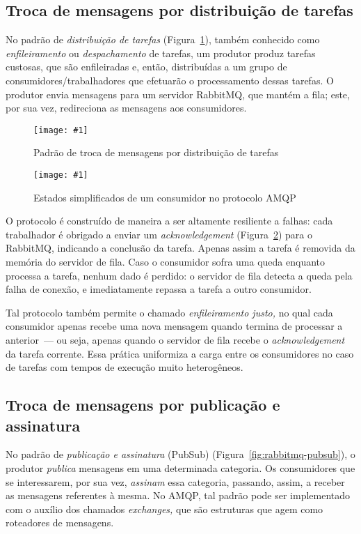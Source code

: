 \documentclass[ruledheader, 12pt]{abnt}
\newcommand{\figcustom}[4]{\par
	\begin{figure}[#3]
		\centering
		\texttt{[image: \#1]}
		\caption{\label{fig:#1}#2}
	\end{figure}
\par}
\newcommand{\figref}[1]{(Figura~\ref{fig:#1})}
\begin{document}
\subsection{Troca de mensagens por distribuição de tarefas}

No padrão de \emph{distribuição de tarefas} \figref{rabbitmq-workqueue}, também conhecido como \emph{enfileiramento} ou \emph{despachamento} de tarefas, um produtor produz tarefas custosas, que são enfileiradas e, então, distribuídas a um grupo de consumidores/trabalhadores que efetuarão o processamento dessas tarefas. O produtor envia mensagens para um servidor RabbitMQ, que mantém a fila; este, por sua vez, redireciona as mensagens aos consumidores.

\figcustom{rabbitmq-workqueue}{Padrão de troca de mensagens por distribuição de tarefas}{tp}{1}

\figcustom{rabbitmq-worker}{Estados simplificados de um consumidor no protocolo AMQP}{tp}{0.6}

\afterpage{\clearpage}

O protocolo é construído de maneira a ser altamente resiliente a falhas: cada trabalhador é obrigado a enviar um \emph{acknowledgement} \figref{rabbitmq-worker} para o RabbitMQ, indicando a conclusão da tarefa. Apenas assim a tarefa é removida da memória do servidor de fila. Caso o consumidor sofra uma queda enquanto processa a tarefa, nenhum dado é perdido: o servidor de fila detecta a queda pela falha de conexão, e imediatamente repassa a tarefa a outro consumidor.

Tal protocolo também permite o chamado \emph{enfileiramento justo,} no qual cada consumidor apenas recebe uma nova mensagem quando termina de processar a anterior~--- ou seja, apenas quando o servidor de fila recebe o \emph{acknowledgement} da tarefa corrente. Essa prática uniformiza a carga entre os consumidores no caso de tarefas com tempos de execução muito heterogêneos.

\subsection{Troca de mensagens por publicação e assinatura}


No padrão de \emph{publicação e assinatura} (PubSub) \figref{rabbitmq-pubsub}, o produtor \emph{publica} mensagens em uma determinada categoria. Os consumidores que se interessarem, por sua vez, \emph{assinam} essa categoria, passando, assim, a receber as mensagens referentes à mesma. No AMQP, tal padrão pode ser implementado com o auxílio dos chamados \emph{exchanges,}  que são estruturas que agem como roteadores de mensagens.
\end{document}

